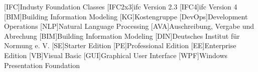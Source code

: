 \begin{acronym}

[IFC]{Industy Foundation Classes}
[IFC2x3]{\ac{ifc} Version 2.3}
[IFC4]{\ac{ifc} Version 4}
[BIM]{Building Information Modeling}
[KG]{Kostengruppe}
[DevOps]{Development Operations}
[NLP]{Natural Language Processing}
[AVA]{Auschreibung, Vergabe und Abrechung}
[BIM]{Building Information Modeling}
[DIN]{Deutsches Institut für Normung e. V.}
[SE]{Starter Edition}
[PE]{Professional Edition}
[EE]{Enterprise Edition}
[VB]{Visual Basic}
[GUI]{Graphical User Interface}
[WPF]{Windows Presentation Foundation}
\end{acronym}